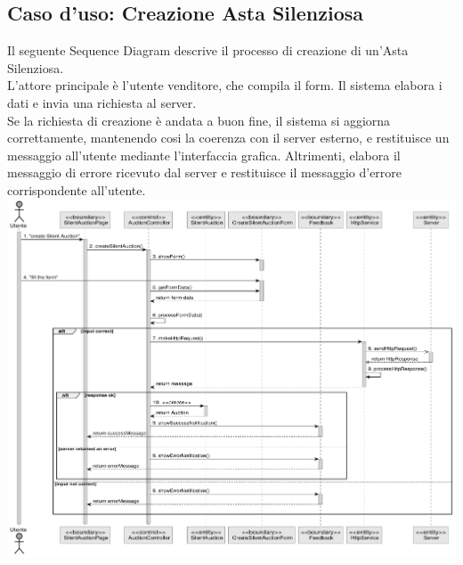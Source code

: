 \subsection{Caso d'uso: Creazione Asta Silenziosa}
Il seguente Sequence Diagram descrive il processo di creazione di un'Asta Silenziosa. 
\\ L'attore principale è l'utente venditore, che compila il form. Il sistema elabora i dati e invia una richiesta al server. 
\\ Se la richiesta di creazione è andata a buon fine, il sistema si aggiorna correttamente, mantenendo cosi la coerenza con il server esterno, e restituisce un messaggio all'utente mediante l'interfaccia grafica. 
Altrimenti, elabora il messaggio di errore ricevuto dal server e restituisce il messaggio d'errore corrispondente all'utente.   
\\
\includegraphics[width=\textwidth]{assets/sequence/creazione_asta_silenziosa.pdf}

\pagebreak
